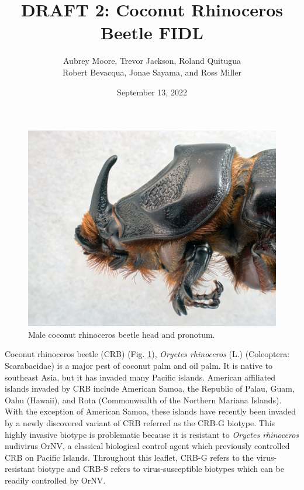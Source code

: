 \documentclass[twocolumn,letterpaper]{scrartcl}
\begin{document}
\title{DRAFT 2: Coconut Rhinoceros Beetle FIDL}
\author{Aubrey Moore, Trevor Jackson, Roland Quitugua\\ Robert Bevacqua, Jonae Sayama, and Ross Miller}
\date{September 13, 2022}
\maketitle


\newpage

\begin{figure}[h]
	\centering
	\includegraphics[width=\linewidth]{images/rhino_beetle_head}
	\caption{Male coconut rhinoceros beetle head and pronotum.}
	\label{fig:rhinobeetlehead}
\end{figure}

Coconut rhinoceros beetle (CRB) (Fig. \ref{fig:rhinobeetlehead}), \textit{Oryctes rhinoceros} (L.) (Coleoptera: Scarabaeidae) is a major pest of coconut palm and oil palm. It is native to southeast Asia, but it has invaded many Pacific islands. American affiliated islands invaded by CRB include American Samoa, the Republic of Palau, Guam, Oahu (Hawaii), and Rota (Commonwealth of the Northern Mariana Islands). With the exception of American Samoa, these islands have recently been invaded by a newly discovered variant of CRB referred as the CRB-G biotype. This highly invasive biotype is problematic because it is resistant to \textit{Oryctes rhinoceros} nudivirus OrNV, a classical biological control agent which previously controlled CRB on Pacific Islands. Throughout this leaflet, CRB-G refers to the virus-resistant biotype and CRB-S refers to virus-susceptible biotypes which can be readily controlled by OrNV.
\end{document}
